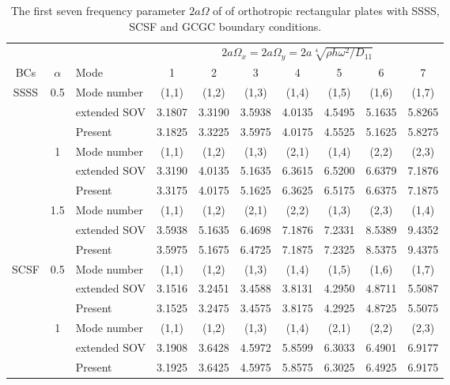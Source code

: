 \documentclass[preprint,12pt]{elsarticle}
\begin{document}
\begin{table}[!htbp] 
	\centering
	\caption{The first seven frequency parameter $2a\Omega$ of of orthotropic rectangular plates with SSSS, SCSF and GCGC boundary conditions.}
	\begin{tabular}{c c l c c c c c c c}
		\toprule
		\multicolumn{3}{c}{} & \multicolumn{7}{c}{$2a\Omega_x=2a\Omega_y=2a\sqrt[4]{\rho h \omega^2/D_{11}}$} \\ 
		\cmidrule(lr){4-10}
		BCs & $\alpha$ & Mode & 1 & 2 & 3 & 4 & 5 & 6 & 7 \\
		\midrule
		SSSS & 0.5 & Mode number  & (1,1) & (1,2) & (1,3) & (1,4) & (1,5) & (1,6) & (1,7) \\
		&     & extended SOV \Citealp{xing2020extended}   & 3.1807 & 3.3190 & 3.5938 & 4.0135 & 4.5495 & 5.1635 & 5.8265 \\
		&     & Present       & 3.1825 & 3.3225 & 3.5975 & 4.0175 & 4.5525 & 5.1625 & 5.8275 \\
		& 1   & Mode number  & (1,1) & (1,2) & (1,3) & (2,1) & (1,4) & (2,2) & (2,3) \\
		&     & extended SOV \Citealp{xing2020extended}   & 3.3190 & 4.0135 & 5.1635 & 6.3615 & 6.5200 & 6.6379 & 7.1876 \\
		&     & Present       & 3.3175 & 4.0175 & 5.1625 & 6.3625 & 6.5175 & 6.6375 & 7.1875 \\
		& 1.5 & Mode number  & (1,1) & (1,2) & (2,1) & (2,2) & (1,3) & (2,3) & (1,4) \\
		&     & extended SOV \Citealp{xing2020extended}   & 3.5938 & 5.1635 & 6.4698 & 7.1876 & 7.2331 & 8.5389 & 9.4352 \\
		&     & Present       & 3.5975 & 5.1675 & 6.4725 & 7.1875 & 7.2325 & 8.5375 & 9.4375 \\
		SCSF & 0.5 & Mode number  & (1,1) & (1,2) & (1,3) & (1,4) & (1,5) & (1,6) & (1,7) \\
		&     & extended SOV \Citealp{xing2020extended}   & 3.1516 & 3.2451 & 3.4588 & 3.8131 & 4.2950 & 4.8711 & 5.5087 \\
		&     & Present      & 3.1525 & 3.2475 & 3.4575 & 3.8175 & 4.2925 & 4.8725 & 5.5075 \\
		& 1   & Mode number  & (1,1) & (1,2) & (1,3) & (1,4) & (2,1) & (2,2) & (2,3) \\
		&     & extended SOV \Citealp{xing2020extended}  & 3.1908 & 3.6428 & 4.5972 & 5.8599 & 6.3033 & 6.4901 & 6.9177 \\
		&     & Present        & 3.1925 & 3.6425 & 4.5975 & 5.8575 & 6.3025 & 6.4925 & 6.9175 \\

\end{tabular}
\end{table}
\end{document}

